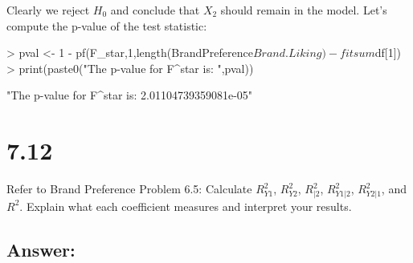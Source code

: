 \documentclass{article}
\begin{document}
\begin{enumerate}[a)]
Clearly we reject $H_0$ and conclude that $X_2$ should remain in the model. Let's compute the p-value of the test statistic:

\begin{Schunk}
\begin{Sinput}
> pval <- 1 - pf(F_star,1,length(BrandPreference$Brand.Liking)-fitsum$df[1])
> print(paste0("The p-value for F^star is: ",pval))
\end{Sinput}
\begin{Soutput}
[1] "The p-value for F^star is: 2.01104739359081e-05"
\end{Soutput}
\end{Schunk}

\end{enumerate}

\section{7.12}

Refer to Brand Preference Problem 6.5: Calculate $R_{Y1}^2$, $R_{Y2}^2$, $R_{|2}^2$, $R_{Y1|2}^2$, $R_{Y2|1}^2$, and $R^2$. Explain what each coefficient measures and interpret your results.

\subsection{Answer:}
\end{document}
